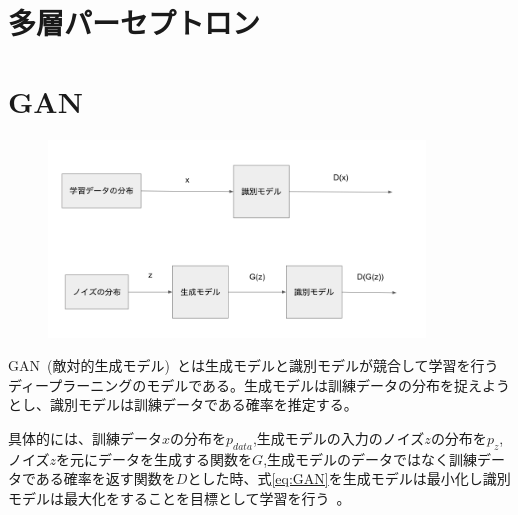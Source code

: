 \section{多層パーセプトロン}





\section{GAN}

\begin{figure}[H]
    \includegraphics[width=10.0cm]{figure/GAN.png}
\end{figure}

GAN~(敵対的生成モデル)~とは生成モデルと識別モデルが競合して学習を行うディープラーニングのモデルである。生成モデルは訓練データの分布を捉えようとし、識別モデルは訓練データである確率を推定する。\par
具体的には、訓練データ$x$の分布を$p_{data}$,生成モデルの入力のノイズ$z$の分布を$p_z$,ノイズ$z$を元にデータを生成する関数を$G$,生成モデルのデータではなく訓練データである確率を返す関数を$D$とした時、式\ref{eq:GAN}を生成モデルは最小化し識別モデルは最大化をすることを目標として学習を行う~\cite{GAN}。


